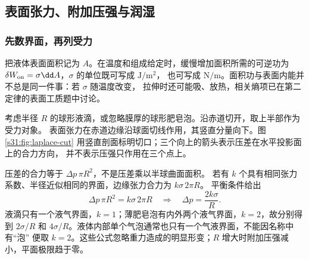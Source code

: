 \subsection*{表面张力、附加压强与润湿}

\subsubsection*{先数界面，再列受力}

把液体表面面积记为 $A$。在温度和组成给定时，缓慢增加面积所需的可逆功为
$\delta W_{\rm on}=\sigma\dd A$，$\sigma$ 的单位既可写成 $\mathrm{J/m^2}$，
也可写成 $\mathrm{N/m}$。面积功与表面内能并不总是同一件事：若 $\sigma$ 随温度改变，
拉伸时还可能吸、放热，相关熵项已在第二定律的表面工质题中讨论。

考虑半径 $R$ 的球形液滴，或忽略膜厚的球形肥皂泡。沿赤道切开，取上半部作为受力对象。
表面张力在赤道边缘沿球面切线作用，其竖直分量向下。图\ref{s31:fig:laplace-cut}
用竖直剖面标明切口；三个向上的箭头表示压差在水平投影面上的合力方向，
并不表示压强只作用在三个点上。

\begin{center}
\label{s31:fig:laplace-cut}
\end{center}

压差的合力等于 $\Delta p\,\pi R^2$，不是压差乘以半球曲面面积。
若有 $k$ 个具有相同张力系数、半径近似相同的界面，边缘张力合力为 $k\sigma\,2\pi R$。
平衡条件给出
\begin{equation}
 \Delta p\,\pi R^2=k\sigma\,2\pi R
 \quad\Longrightarrow\quad
 \Delta p=\frac{2k\sigma}{R}.
\end{equation}
液滴只有一个液气界面，$k=1$；薄肥皂泡有内外两个液气界面，$k=2$，故分别得到
$2\sigma/R$ 和 $4\sigma/R$。液体内部单个气泡通常也只有一个气液界面，不能因名称中有“泡”
便取 $k=2$。这些公式忽略重力造成的明显形变；$R$ 增大时附加压强减小，平面极限趋于零。

